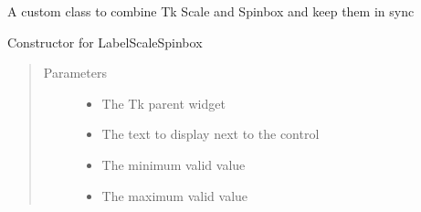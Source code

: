 \documentclass[letterpaper,10pt,english,openany,oneside]{sphinxmanual}
\begin{document}
\begin{fulllineitems}
\label{\detokenize{src/positionframe:PositionFrame.LabelScaleSpinbox}}
A custom class to combine Tk Scale and Spinbox and keep them in sync

\begin{fulllineitems}
\label{\detokenize{src/positionframe:PositionFrame.LabelScaleSpinbox.__init__}}
Constructor for LabelScaleSpinbox
\begin{quote}\begin{description}
\item[{Parameters}] \leavevmode\begin{itemize}
\item {} 
 \textendash{} The Tk parent widget

\item {} 
 \textendash{} The text to display next to the control

\item {} 
 \textendash{} The minimum valid value

\item {} 
 \textendash{} The maximum valid value


\end{itemize}
\end{description}
\end{quote}
\end{fulllineitems}
\end{fulllineitems}
\end{document}
